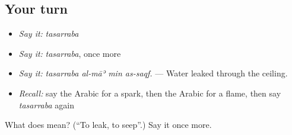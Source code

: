 \subsection*{Your turn}
\begin{itemize}
\raggedright
  \item \emph{Say it:} \emph{tasarraba}
  \item \emph{Say it:} \emph{tasarraba}, once more
  \item \emph{Say it:} \emph{tasarraba al-māʾ min as-saqf.} — Water leaked through the ceiling.
  \item \emph{Recall:} say the Arabic for a spark, then the Arabic for a flame, then say \emph{tasarraba} again
\end{itemize}

\begin{tcolorbox}[breakable,colback=teal!4,colframe=teal!35!black,title={Before you move on}]
What does  mean? (\textquotedblleft{}To leak, to seep\textquotedblright{}.) Say it once more.
\end{tcolorbox}
